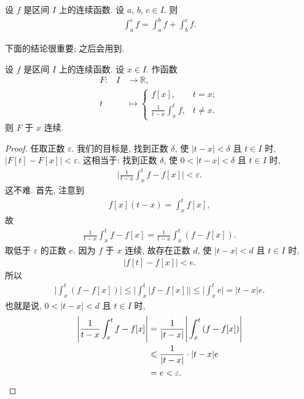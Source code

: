\begin{theorem}
    设 $f$ 是区间 $I$ 上的连续函数. 设 $a$, $b$, $c \in I$. 则
    \begin{align*}
        \int_{a}^{c} {f} = \int_{a}^{b} {f} + \int_{b}^{c} {f}.
    \end{align*}
\end{theorem}

下面的结论很重要; 之后会用到.

\begin{theorem}
    设 $f$ 是区间 $I$ 上的连续函数. 设 $x \in I$. 作函数
    \begin{align*}
        \text{$F$:} \quad
        I & \to \mathbb{R},                                                       \\
        t & \mapsto \begin{cases}
                        f[x],                                             & t = x;    \\
                        {\displaystyle \frac{1}{t - x} \int_{x}^{t} {f}}, & t \neq x.
                    \end{cases}
    \end{align*}
    则 $F$ 于 $x$ 连续.
\end{theorem}

\begin{proof}
    任取正数 $\varepsilon$. 我们的目标是, 找到正数 $\delta$, 使 $|t - x| < \delta$ 且 $t \in I$ 时, $|F[t] - F[x]| < \varepsilon$. 这相当于: 找到正数 $\delta$, 使 $0 < |t - x| < \delta$ 且 $t \in I$ 时,
    \begin{align*}
        \Bigg| \frac{1}{t - x} \int_{x}^{t} {f} - f[x] \Bigg| < \varepsilon.
    \end{align*}
    这不难. 首先, 注意到
    \begin{align*}
        f[x](t - x) = \int_{x}^{t} {f[x]},
    \end{align*}
    故
    \begin{align*}
        \frac{1}{t - x} \int_{x}^{t} {f} - f[x] = \frac{1}{t - x} \int_{x}^{t} {(f - f[x])}.
    \end{align*}
    取低于 $\varepsilon$ 的正数 $e$. 因为 $f$ 于 $x$ 连续, 故存在正数 $d$, 使 $|t - x| < d$ 且 $t \in I$ 时,
    \begin{align*}
        |f[t] - f[x]| < e.
    \end{align*}
    所以
    \begin{align*}
        \Bigg| \int_{x}^{t} {(f - f[x])} \Bigg| \leq \Bigg| \int_{x}^{t} {|f - f[x]|} \Bigg| \leq \Bigg| \int_{x}^{t} {e} \Bigg| = |t - x|e.
    \end{align*}
    也就是说, $0 < |t - x| < d$ 且 $t \in I$ 时,
    \begin{align*}
        {\Bigg| \frac{1}{t - x} \int_{x}^{t} {f} - f[x] \Bigg|}
        = {}    & \frac{1}{|t - x|} \Bigg| \int_{x}^{t} {(f - f[x])} \Bigg| \\
        \leq {} & \frac{1}{|t - x|} \cdot |t - x|e                          \\
        = {}    & e < \varepsilon. \qedhere
    \end{align*}
\end{proof}
